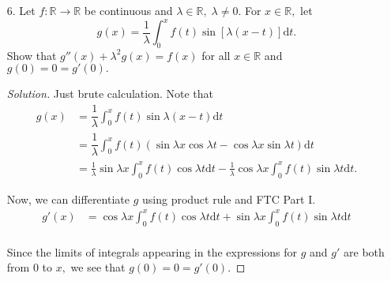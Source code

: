 \documentclass[12pt]{article}
\theoremstyle{definition}
\newenvironment{soln}{\begin{proof}[Solution]}{\end{proof}}
\begin{document}
\begin{itemize}
\begin{soln}
		Both the parts are now solved easily.
		\begin{itemize}
			\item[(i)] We have {\color{myupdatecolor}${\color{myupdatecolor}a = 1},$} $g(t) = \cos(t^2)$ and $v(x) = 2x.$ Thus, $v'(x) = 2$ and 
			\begin{equation*} 
				\boxed{F'(x) = 2\cos(4x^2).}
			\end{equation*}
			\item[(ii)] We have {\color{myupdatecolor}${\color{myupdatecolor}a = 0},$} $g(t) = \cos(t)$ and $v(x) = x^2.$ Thus, $v'(x) = 2x$ and 
			\begin{equation*} 
				\boxed{F'(x) = 2x\cos(x^2).} \qedhere
			\end{equation*}
		\end{itemize}
	\end{soln}
	\newpage
	\item[6.] Let $f:\mathbb{R} \to \mathbb{R}$ be continuous and $\lambda \in \mathbb{R},\; \lambda \neq 0.$ For $x \in \mathbb{R},$ let
	\begin{equation*} 
		g(x) = \dfrac{1}{\lambda}\int_{0}^{x} f(t)\sin\left[\lambda(x - t)\right] {\mathrm{d}}t.
	\end{equation*}
	Show that $g''(x) + \lambda^2g(x) = f(x)$ for all $x \in \mathbb{R}$ and $g(0) = 0 = g'(0).$

	\begin{soln}
		Just brute calculation. Note that
		\begin{align*}
			g(x) &= \dfrac{1}{\lambda}\int_{0}^{x} f(t)\sin \lambda(x - t) {\mathrm{d}}t\\
			&= \dfrac{1}{\lambda}\int_{0}^{x} f(t) \left(\sin \lambda x\cos \lambda t - \cos \lambda x \sin \lambda t\right) {\mathrm{d}}t\\
			&= \frac{1}{\lambda}\sin\lambda x\int_{0}^{x} f(t)\cos \lambda t {\mathrm{d}}t - \frac{1}{\lambda}\cos \lambda x \int_{0}^{x} f(t)\sin \lambda t {\mathrm{d}}t.
		\end{align*}

		Now, we can differentiate $g$ using product rule and FTC Part I.
		\begin{align*}
			g'(x) &= \cos\lambda x\int_{0}^{x} f(t)\cos \lambda t {\mathrm{d}}t + \sin \lambda x \int_{0}^{x} f(t)\sin \lambda t {\mathrm{d}}t \\
		\end{align*}

		Since the limits of integrals appearing in the expressions for $g$ and $g'$ are both from $0$ to $x,$ we see that $g(0) = 0 = g'(0).$


\end{soln}
\end{itemize}
\end{document}
